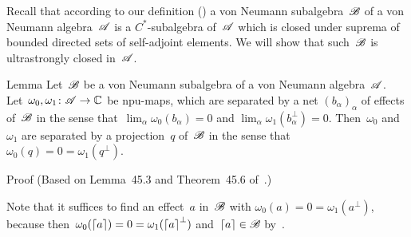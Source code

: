 \documentclass[a]{subfiles}
\begin{document}
\begin{parsec}%
\begin{point}%
Recall that according to our definition ()
a von Neumann subalgebra~$\mathscr{B}$ 
of a von Neumann algebra~$\mathscr{A}$
is a $C^*$-subalgebra of~$\mathscr{A}$
which is closed under suprema
of bounded directed sets of self-adjoint elements.
We will show that such~$\mathscr{B}$ is ultrastrongly closed in~$\mathscr{A}$.
\end{point}
\begin{point}{Lemma}%
Let~$\mathscr{B}$ be a von Neumann subalgebra
of a von Neumann algebra~$\mathscr{A}$.
Let~$\omega_0,\omega_1\colon \mathscr{A}\to\mathbb{C}$
be npu-maps,
which are separated
by a net $(b_\alpha)_\alpha$
of effects of~$\mathscr{B}$ 
in the sense that~$\lim_\alpha \omega_0(b_\alpha)=0$
and $\lim_\alpha \omega_1(b_\alpha^\perp)=0$.
Then~$\omega_0$ and~$\omega_1$ are separated by a 
projection~$q$ of~$\mathscr{B}$ 
in the sense that~$\omega_0(q)= 0 = \omega_1(q^\perp)$.
\begin{point}{Proof}%
(Based on Lemma~45.3 and Theorem~45.6 of~\cite{conway2000}.)

Note that it suffices to find an effect~$a$ in~$\mathscr{B}$
with $\omega_0(a) = 0 = \omega_1(a^\perp)$,
because then~$\omega_0(\left\lceil a\right\rceil) = 0 = \omega_1(\left\lceil a\right\rceil^\perp)$
and~$\left\lceil a\right\rceil\in\mathscr{B}$ by~\TODO{}.


\end{point}
\end{point}
\end{parsec}
\end{document}
